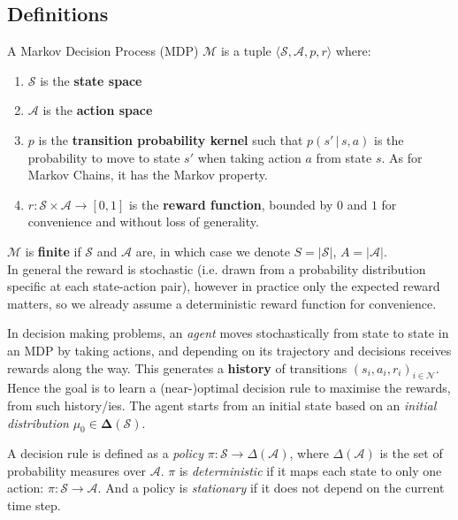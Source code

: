 \subsection{Definitions}
\label{subsec:MDP-defs}

\begin{defi}
  A Markov Decision Process (MDP) $\mathcal{M}$ is a tuple $\langle \mathcal{S}, \mathcal{A}, p, r \rangle$ where:
  \begin{enumerate}
  \item $\mathcal{S}$ is the \textbf{state space}
  \item $\mathcal{A}$ is the \textbf{action space}
  \item $p $ is the \textbf{transition probability kernel} such that $p(s' \,|\, s, a)$ is the probability to move to state $s'$ when taking action $a$ from state $s$. As for Markov Chains, it has the Markov property.
  \item $r: \mathcal{S} \times \mathcal{A} \to [0,1]$ is the \textbf{reward function}, bounded by $0$ and $1$ for convenience and without loss of generality.
  \end{enumerate}
  $\mathcal{M}$ is \textbf{finite} if $\mathcal{S}$ and $\mathcal{A}$ are, in which case we denote $S = |\mathcal{S}|$, $A = |\mathcal{A}|$.\\
  In general the reward is stochastic (i.e. drawn from a probability distribution specific at each state-action pair), however in practice only the expected reward matters, so we already assume a deterministic reward function for convenience.
\end{defi}

In decision making problems, an \emph{agent} moves stochastically from state to state in an MDP by taking actions, and depending on its trajectory and decisions receives rewards along the way. This generates a \textbf{history} of transitions $(s_i, a_i, r_i)_{i \in \mathcal{N}}$. Hence the goal is to learn a (near-)optimal decision rule to maximise the rewards, from such history/ies. The agent starts from an initial state based on an \emph{initial distribution} $\mu_0 \in \mathbf{\Delta}(\mathcal{S})$.

A decision rule is defined as a \emph{policy} $\pi : \mathcal{S} \to \Delta(\mathcal{A})$, where $\Delta(\mathcal{A})$ is the set of probability measures over $\mathcal{A}$. $\pi$ is \emph{deterministic} if it maps each state to only one action: $\pi : \mathcal{S} \to \mathcal{A}$. And a policy is \emph{stationary} if it does not depend on the current time step.


